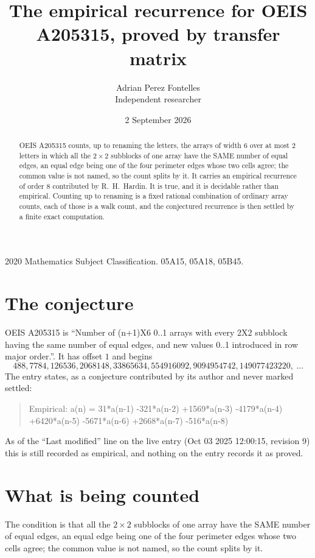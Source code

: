 \documentclass[11pt,a4paper]{article}
\title{The empirical recurrence for OEIS A205315, proved by transfer matrix}
\author{Adrian Perez Fontelles\\ \small Independent researcher}
\date{2 September 2026}
\theoremstyle{plain}
\theoremstyle{definition}
\begin{document}
\maketitle

\begin{abstract}
OEIS A205315 counts, up to renaming the letters, the arrays of width $6$ over at most $2$
letters in which all the $2\times2$ subblocks of one array have the SAME number of equal edges, an equal edge being one of the four perimeter edges whose two cells agree; the common value is not named, so the count splits by it. It carries an empirical recurrence of order $8$ contributed by
R.~H.~Hardin. It is true, and it is decidable rather than empirical. Counting up to renaming is
a fixed rational combination of ordinary array counts, each of those is a walk count, and the
conjectured recurrence is then settled by a finite exact computation.
\end{abstract}

\noindent\small 2020 Mathematics Subject Classification. 05A15, 05A18, 05B45.\normalsize

\section{The conjecture}

OEIS A205315 is ``Number of (n+1)X6 0..1 arrays with every 2X2 subblock having the same number of equal edges, and new values 0..1 introduced in row major order.''. It has offset $1$ and begins
\[
488, 7784, 126536, 2068148, 33865634, 554916092, 9094954742, 149077423220,\ \dots
\]
The entry states, as a conjecture contributed by its author and never marked settled:
\begin{quote}
Empirical: a(n) = 31*a(n-1) -321*a(n-2) +1569*a(n-3) -4179*a(n-4) +6420*a(n-5) -5671*a(n-6) +2668*a(n-7) -516*a(n-8)
\end{quote}
As of the ``Last modified'' line on the live entry (Oct 03 2025 12:00:15, revision 9) this is still
recorded as empirical, and nothing on the entry records it as proved.

\section{What is being counted}

The condition is that all the $2\times2$ subblocks of one array have the SAME number of equal edges, an equal edge being one of the four perimeter edges whose two cells agree; the common value is not named, so the count splits by it.
\end{document}
